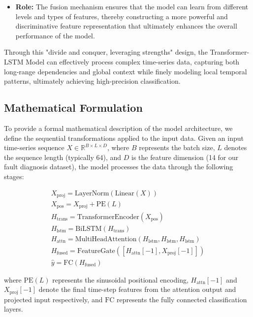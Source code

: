\begin{itemize}
\begin{itemize}
        \item \textbf{Role:} The fusion mechanism ensures that the model can learn from different levels and types of features, thereby constructing a more powerful and discriminative feature representation that ultimately enhances the overall performance of the model.
    \end{itemize}
\end{itemize}

Through this "divide and conquer, leveraging strengths" design, the Transformer-LSTM Model can effectively process complex time-series data, capturing both long-range dependencies and global context while finely modeling local temporal patterns, ultimately achieving high-precision classification.

\subsection{Mathematical Formulation}
\label{subsec:mathematical_formulation}

To provide a formal mathematical description of the model architecture, we define the sequential transformations applied to the input data. Given an input time-series sequence $X \in \mathbb{R}^{B \times L \times D}$, where $B$ represents the batch size, $L$ denotes the sequence length (typically 64), and $D$ is the feature dimension (14 for our fault diagnosis dataset), the model processes the data through the following stages:

\begin{align}
X_{\text{proj}} = \text{LayerNorm}(\text{Linear}(X)) \label{eq:input_projection} \\
X_{\text{pos}} = X_{\text{proj}} + \text{PE}(L) \label{eq:positional_encoding} \\
H_{\text{trans}} = \text{TransformerEncoder}(X_{\text{pos}}) \label{eq:transformer} \\
H_{\text{lstm}} = \text{BiLSTM}(H_{\text{trans}}) \label{eq:lstm} \\
H_{\text{attn}} = \text{MultiHeadAttention}(H_{\text{lstm}}, H_{\text{lstm}}, H_{\text{lstm}}) \label{eq:attention} \\
H_{\text{fused}} = \text{FeatureGate}([H_{\text{attn}}[-1], X_{\text{proj}}[-1]]) \label{eq:fusion} \\
\hat{y} = \text{FC}(H_{\text{fused}}) \label{eq:output}
\end{align}

where $\text{PE}(L)$ represents the sinusoidal positional encoding, $H_{\text{attn}}[-1]$ and $X_{\text{proj}}[-1]$ denote the final time-step features from the attention output and projected input respectively, and $\text{FC}$ represents the fully connected classification layers.

